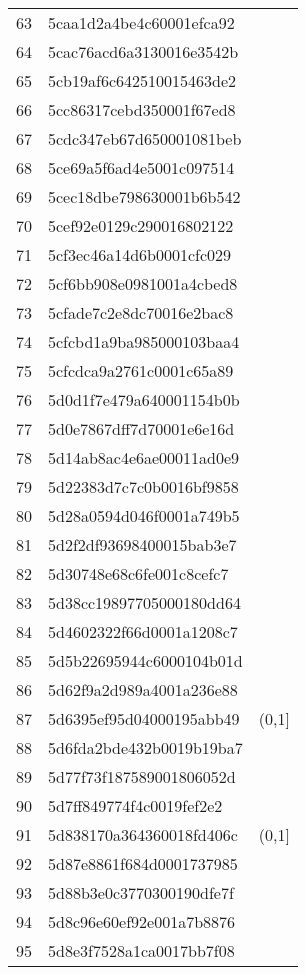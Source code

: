 \begin{table}[ht]
\begin{tabular}{rll}
  63 & 5caa1d2a4be4c60001efca92 &  \\ 
  64 & 5cac76acd6a3130016e3542b &  \\ 
  65 & 5cb19af6c642510015463de2 &  \\ 
  66 & 5cc86317cebd350001f67ed8 &  \\ 
  67 & 5cdc347eb67d650001081beb &  \\ 
  68 & 5ce69a5f6ad4e5001c097514 &  \\ 
  69 & 5cec18dbe798630001b6b542 &  \\ 
  70 & 5cef92e0129c290016802122 &  \\ 
  71 & 5cf3ec46a14d6b0001cfc029 &  \\ 
  72 & 5cf6bb908e0981001a4cbed8 &  \\ 
  73 & 5cfade7c2e8dc70016e2bac8 &  \\ 
  74 & 5cfcbd1a9ba985000103baa4 &  \\ 
  75 & 5cfcdca9a2761c0001c65a89 &  \\ 
  76 & 5d0d1f7e479a640001154b0b &  \\ 
  77 & 5d0e7867dff7d70001e6e16d &  \\ 
  78 & 5d14ab8ac4e6ae00011ad0e9 &  \\ 
  79 & 5d22383d7c7c0b0016bf9858 &  \\ 
  80 & 5d28a0594d046f0001a749b5 &  \\ 
  81 & 5d2f2df93698400015bab3e7 &  \\ 
  82 & 5d30748e68c6fe001c8cefc7 &  \\ 
  83 & 5d38cc19897705000180dd64 &  \\ 
  84 & 5d4602322f66d0001a1208c7 &  \\ 
  85 & 5d5b22695944c6000104b01d &  \\ 
  86 & 5d62f9a2d989a4001a236e88 &  \\ 
  87 & 5d6395ef95d04000195abb49 & (0,1] \\ 
  88 & 5d6fda2bde432b0019b19ba7 &  \\ 
  89 & 5d77f73f187589001806052d &  \\ 
  90 & 5d7ff849774f4c0019fef2e2 &  \\ 
  91 & 5d838170a364360018fd406c & (0,1] \\ 
  92 & 5d87e8861f684d0001737985 &  \\ 
  93 & 5d88b3e0c3770300190dfe7f &  \\ 
  94 & 5d8c96e60ef92e001a7b8876 &  \\ 
  95 & 5d8e3f7528a1ca0017bb7f08 &  \\ 

\end{tabular}
\end{table}
